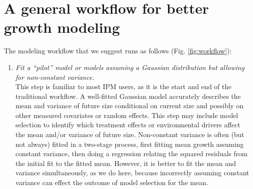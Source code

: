 \documentclass[11pt]{article}
\newcommand{\tom}[2]{{\color{red}{#1}}\footnote{\textit{\color{red}{#2}}}}
\begin{document}
{%

\section{A general workflow for better growth modeling}
The modeling workflow that we suggest runs as follows (Fig. \ref{fig:workflow}):
\begin{enumerate}
\item \textit{Fit a ``pilot'' model or models assuming a Gaussian distribution but allowing for non-constant variance.}
\\ 
This step is familiar to most IPM users, as it is the start and end of the traditional workflow. 
A well-fitted Gaussian model accurately describes the mean and variance of future size conditional on current size and 
possibly on other measured covariates or random effects. 
This step may include model selection to identify which treatment effects or environmental drivers affect the mean and/or 
variance of future size. 
Non-constant variance is often (but not always) fitted in a two-stage process, first fitting mean growth assuming constant variance, 
then doing a regression relating the squared residuals from the initial fit to the fitted mean. 
However, it is better to fit the mean and variance simultaneously, as we do here, because incorrectly assuming constant variance 
can effect the outcome of model selection for the mean.  


\end{enumerate}}
\end{document}
